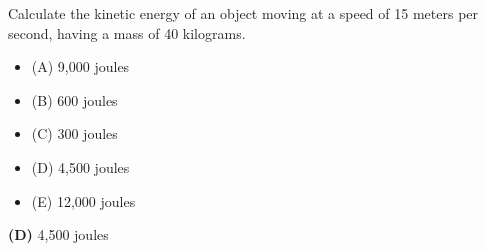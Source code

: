 

Calculate the kinetic energy of an object moving at a speed of 15 meters per second, having a mass of 40 kilograms.

\begin{itemize}
\item{(A)} 9,000 joules
\vskip 5pt 
\item{(B)} 600 joules
\vskip 5pt 
\item{(C)} 300 joules
\vskip 5pt 
\item{(D)} 4,500 joules
\vskip 5pt 
\item{(E)} 12,000 joules
\end{itemize}







{\bf (D)} 4,500 joules
 










